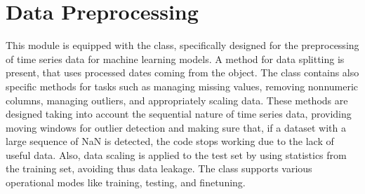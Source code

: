 \documentclass[letterpaper,10pt,english]{sphinxmanual}
\begin{document}
\section{Data Preprocessing}
\label{\detokenize{docs/data_preprocessing:data-preprocessing}}\label{\detokenize{docs/data_preprocessing::doc}}
\sphinxAtStartPar
This module is equipped with the  class, specifically designed for the preprocessing of time series data
for machine learning models.
A method for data splitting is present, that uses processed dates coming from the  object.
The class contains also specific methods for tasks such as managing missing values,
removing non\sphinxhyphen{}numeric columns, managing outliers, and appropriately scaling data.
These methods are designed taking into account the sequential nature of time series data, providing moving windows for outlier detection
and making sure that, if a dataset with a large sequence of NaN is detected, the code stops working due to the lack of
useful data. Also, data scaling is applied to the test set by using statistics from the training set, avoiding thus data leakage.
The class supports various operational modes like training, testing, and fine\sphinxhyphen{}tuning.
\label{\detokenize{docs/data_preprocessing:module-data_preprocessing}}
\end{document}
